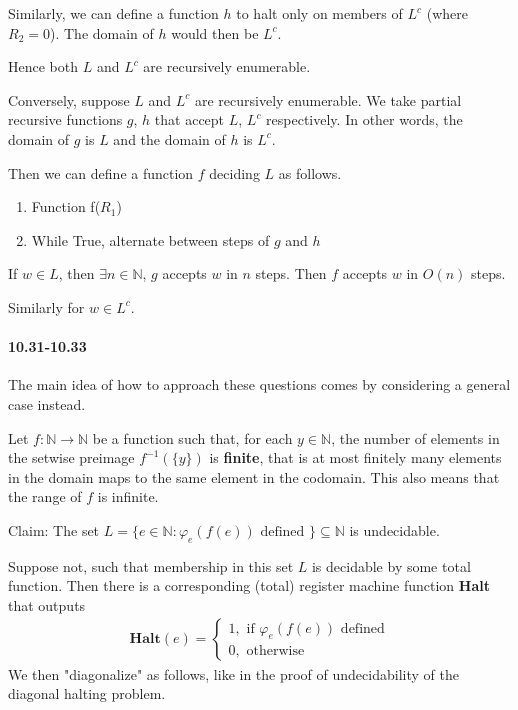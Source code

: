 \documentclass{article}
\begin{document}
Similarly, we can define a function $h$ to halt only on members of $L^c$ (where $R_2=0$). The domain of $h$ would then be $L^c$.

Hence both $L$ and $L^c$ are recursively enumerable.

Conversely, suppose $L$ and $L^c$ are recursively enumerable. We take partial recursive functions $g$, $h$ that accept $L$, $L^c$ respectively. In other words, the domain of $g$ is $L$ and the domain of $h$ is $L^c$.

Then we can define a function $f$ deciding $L$ as follows.
\begin{enumerate}
	\item Function f($R_1$)
	\item While True, alternate between steps of $g$ and $h$
\end{enumerate}

If $w\in L$, then $\exists n\in \mathbb{N}$, $g$ accepts $w$ in $n$ steps. Then $f$ accepts $w$ in $O(n)$ steps.

Similarly for $w\in L^c$.


\paragraph{10.31-10.33} The main idea of how to approach these questions comes by considering a general case instead.

Let $f:\mathbb{N}\rightarrow \mathbb{N}$ be a function such that, for each $y\in \mathbb{N}$, the number of elements in the setwise preimage $f^{-1}(\{y\})$ is \textbf{finite}, that is at most finitely many elements in the domain maps to the same element in the codomain. This also means that the range of $f$ is infinite.

Claim: The set $L=\{e\in \mathbb{N} : \varphi_e(f(e)) \text{ defined }\}\subseteq \mathbb{N}$ is undecidable.

Suppose not, such that membership in this set $L$ is decidable by some total function. Then there is a corresponding (total) register machine function \textbf{Halt} that outputs
\begin{align*}
	\mathbf{Halt}(e)=
	\begin{cases}
		1, \text{ if }\varphi_e(f(e))\text{ defined}\\
		0, \text{ otherwise}
	\end{cases}
\end{align*}
We then "diagonalize" as follows, like in the proof of undecidability of the diagonal halting problem.
\end{document}
